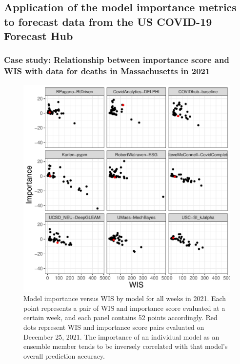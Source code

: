 \documentclass{article}
\theoremstyle{definition}
\begin{document}
\subsection{Application of the model importance metrics to forecast data from the US COVID-19 Forecast Hub}\label{subsec:application}

\subsubsection{Case study: Relationship between importance score and WIS with data for deaths in Massachusetts in 2021}

\begin{figure}[b!]
\centering
\includegraphics{manuscript-fig2.importance-vs-wis-by-model}

\caption{Model importance versus WIS by model for all weeks in 2021. Each point represents a pair of WIS and importance score evaluated at a certain week, and each panel contains 52 points accordingly. Red dots represent WIS and importance score pairs evaluated on December 25, 2021. The importance of an individual model as an ensemble member tends to be inversely correlated with that model's overall prediction accuracy.}
\label{fig:scatterplot-wis_imp2021}
\end{figure}
\end{document}
